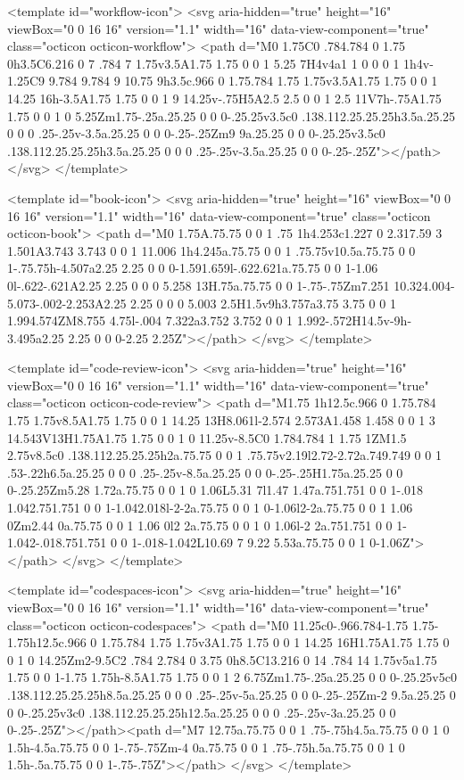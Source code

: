<template id="workflow-icon">
  <svg aria-hidden="true" height="16" viewBox="0 0 16 16" version="1.1" width="16" data-view-component="true" class="octicon octicon-workflow">
    <path d="M0 1.75C0 .784.784 0 1.75 0h3.5C6.216 0 7 .784 7 1.75v3.5A1.75 1.75 0 0 1 5.25 7H4v4a1 1 0 0 0 1 1h4v-1.25C9 9.784 9.784 9 10.75 9h3.5c.966 0 1.75.784 1.75 1.75v3.5A1.75 1.75 0 0 1 14.25 16h-3.5A1.75 1.75 0 0 1 9 14.25v-.75H5A2.5 2.5 0 0 1 2.5 11V7h-.75A1.75 1.75 0 0 1 0 5.25Zm1.75-.25a.25.25 0 0 0-.25.25v3.5c0 .138.112.25.25.25h3.5a.25.25 0 0 0 .25-.25v-3.5a.25.25 0 0 0-.25-.25Zm9 9a.25.25 0 0 0-.25.25v3.5c0 .138.112.25.25.25h3.5a.25.25 0 0 0 .25-.25v-3.5a.25.25 0 0 0-.25-.25Z"></path>
</svg>
</template>

<template id="book-icon">
  <svg aria-hidden="true" height="16" viewBox="0 0 16 16" version="1.1" width="16" data-view-component="true" class="octicon octicon-book">
    <path d="M0 1.75A.75.75 0 0 1 .75 1h4.253c1.227 0 2.317.59 3 1.501A3.743 3.743 0 0 1 11.006 1h4.245a.75.75 0 0 1 .75.75v10.5a.75.75 0 0 1-.75.75h-4.507a2.25 2.25 0 0 0-1.591.659l-.622.621a.75.75 0 0 1-1.06 0l-.622-.621A2.25 2.25 0 0 0 5.258 13H.75a.75.75 0 0 1-.75-.75Zm7.251 10.324.004-5.073-.002-2.253A2.25 2.25 0 0 0 5.003 2.5H1.5v9h3.757a3.75 3.75 0 0 1 1.994.574ZM8.755 4.75l-.004 7.322a3.752 3.752 0 0 1 1.992-.572H14.5v-9h-3.495a2.25 2.25 0 0 0-2.25 2.25Z"></path>
</svg>
</template>

<template id="code-review-icon">
  <svg aria-hidden="true" height="16" viewBox="0 0 16 16" version="1.1" width="16" data-view-component="true" class="octicon octicon-code-review">
    <path d="M1.75 1h12.5c.966 0 1.75.784 1.75 1.75v8.5A1.75 1.75 0 0 1 14.25 13H8.061l-2.574 2.573A1.458 1.458 0 0 1 3 14.543V13H1.75A1.75 1.75 0 0 1 0 11.25v-8.5C0 1.784.784 1 1.75 1ZM1.5 2.75v8.5c0 .138.112.25.25.25h2a.75.75 0 0 1 .75.75v2.19l2.72-2.72a.749.749 0 0 1 .53-.22h6.5a.25.25 0 0 0 .25-.25v-8.5a.25.25 0 0 0-.25-.25H1.75a.25.25 0 0 0-.25.25Zm5.28 1.72a.75.75 0 0 1 0 1.06L5.31 7l1.47 1.47a.751.751 0 0 1-.018 1.042.751.751 0 0 1-1.042.018l-2-2a.75.75 0 0 1 0-1.06l2-2a.75.75 0 0 1 1.06 0Zm2.44 0a.75.75 0 0 1 1.06 0l2 2a.75.75 0 0 1 0 1.06l-2 2a.751.751 0 0 1-1.042-.018.751.751 0 0 1-.018-1.042L10.69 7 9.22 5.53a.75.75 0 0 1 0-1.06Z"></path>
</svg>
</template>

<template id="codespaces-icon">
  <svg aria-hidden="true" height="16" viewBox="0 0 16 16" version="1.1" width="16" data-view-component="true" class="octicon octicon-codespaces">
    <path d="M0 11.25c0-.966.784-1.75 1.75-1.75h12.5c.966 0 1.75.784 1.75 1.75v3A1.75 1.75 0 0 1 14.25 16H1.75A1.75 1.75 0 0 1 0 14.25Zm2-9.5C2 .784 2.784 0 3.75 0h8.5C13.216 0 14 .784 14 1.75v5a1.75 1.75 0 0 1-1.75 1.75h-8.5A1.75 1.75 0 0 1 2 6.75Zm1.75-.25a.25.25 0 0 0-.25.25v5c0 .138.112.25.25.25h8.5a.25.25 0 0 0 .25-.25v-5a.25.25 0 0 0-.25-.25Zm-2 9.5a.25.25 0 0 0-.25.25v3c0 .138.112.25.25.25h12.5a.25.25 0 0 0 .25-.25v-3a.25.25 0 0 0-.25-.25Z"></path><path d="M7 12.75a.75.75 0 0 1 .75-.75h4.5a.75.75 0 0 1 0 1.5h-4.5a.75.75 0 0 1-.75-.75Zm-4 0a.75.75 0 0 1 .75-.75h.5a.75.75 0 0 1 0 1.5h-.5a.75.75 0 0 1-.75-.75Z"></path>
</svg>
</template>

